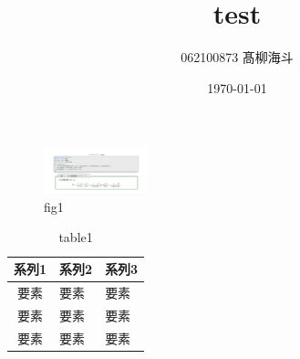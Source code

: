 \documentclass[uplatex,dvipdfmx,ja=standard,a4paper]{bxjsarticle}
\begin{document}
\title{test}
\author{062100873 髙柳海斗}
\date{\today}
\maketitle

\begin{figure}[h]
  \centering
  \includegraphics[keepaspectratio, width=3cm,clip]{hoge.png}
  \caption{fig1}
  \label{fig:1}
\end{figure}

\begin{table}[h]
  \centering
  \caption{table1}
  \label{table:1}
  \begin{tabular}{cll}
    \hline
    系列1 & 系列2 & 系列3 \\
    \hline
    要素 & 要素 & 要素 \\[-4pt]
    要素 & 要素 & 要素 \\[-4pt]
    要素 & 要素 & 要素 \\
    \hline
  \end{tabular}
\end{table}
\end{document}
